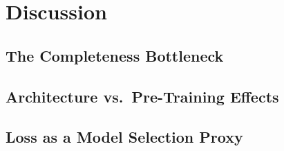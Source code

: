 \documentclass[runningheads]{llncs}
\begin{document}
\section{Discussion}
\label{sec:discussion}

\subsection{The Completeness Bottleneck}
\label{sec:disc_completeness}

\subsection{Architecture vs.\ Pre-Training Effects}
\label{sec:disc_arch_pretraining}

\subsection{Loss as a Model Selection Proxy}
\label{sec:disc_loss_proxy}
\end{document}
